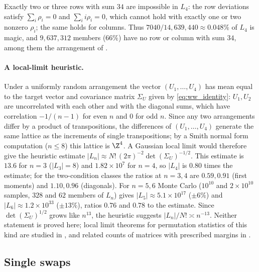 Exactly two or three rows with sum $34$ are impossible in $L_4$: the row deviations satisfy $\sum_i\rho_i=0$ and $\sum_ii\rho_i=0$, which cannot hold with exactly one or two nonzero $\rho_i$; the same holds for columns.
Thus $7040/14{,}639{,}440\approx0.048\%$ of $L_4$ is magic, and $9{,}637{,}312$ members ($66\%$) have no row or column with sum $34$, among them the arrangement of .

\paragraph{A local-limit heuristic.}
Under a uniformly random arrangement the vector $(U_1,\dots,U_4)$ has mean equal to the target vector and covariance matrix $\Sigma_U$ given by \eqref{eq:ww_identity}: $U_1,U_2$ are uncorrelated with each other and with the diagonal sums, which have correlation $-1/(n-1)$ for even $n$ and $0$ for odd $n$.
Since any two arrangements differ by a product of transpositions, the differences of $(U_1,\dots,U_4)$ generate the same lattice as the increments of single transpositions; by a Smith normal form computation ($n\le8$) this lattice is $\Z^4$.
A Gaussian local limit would therefore give the heuristic estimate $|L_n|\approx N!\,(2\pi)^{-2}\det(\Sigma_U)^{-1/2}$.
This estimate is $13.6$ for $n=3$ ($|L_3|=8$) and $1.82\times10^{7}$ for $n=4$, so $|L_4|$ is $0.80$ times the estimate; for the two-condition classes the ratios at $n=3,4$ are $0.59,0.91$ (first moments) and $1.10,0.96$ (diagonals).
For $n=5,6$ Monte Carlo ($10^{10}$ and $2\times10^{10}$ samples, $328$ and $62$ members of $L_n$) gives $|L_5|\approx5.1\times10^{17}$ ($\pm6\%$) and $|L_6|\approx1.2\times10^{33}$ ($\pm13\%$), ratios $0.76$ and $0.78$ to the estimate.
Since $\det(\Sigma_U)^{1/2}$ grows like $n^{13}$, the heuristic suggests $|L_n|/N!\asymp n^{-13}$.
Neither statement is proved here; local limit theorems for permutation statistics of this kind are studied in \cite{kuperberg2017probabilistic,eberhard2019additive}, and related counts of matrices with prescribed margins in \cite{canfield2010asymptotic}.

\subsection{Single swaps}
\label{sec:swap-gaps}

